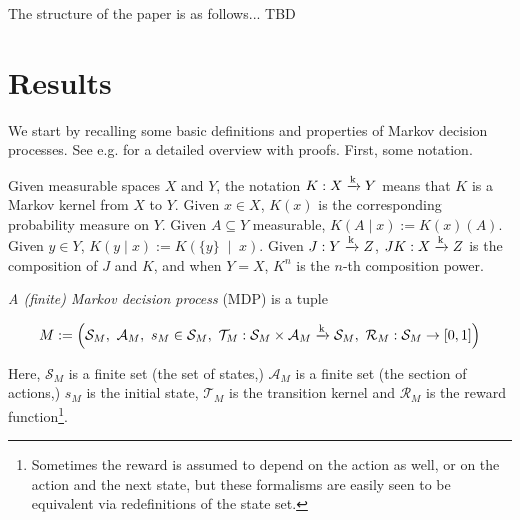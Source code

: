 \documentclass[anon,12pt]{colt2018} %
\newcommand{\Comment}[1]{}
\newcommand{\AP}[1]{\left(#1\right)}
\newcommand{\APM}[2]{\left(#1\;\middle\vert\;#2\right)}
\newcommand{\K}{\xrightarrow{\textnormal{k}}}
\newcommand{\A}{\mathcal{A}}
\newcommand{\St}{\mathcal{S}}
\newcommand{\T}{\mathcal{T}}
\newcommand{\R}{\mathcal{R}}
\begin{document}
\Comment{We also consider situations in which there are states of the environment (that we call \enquote{corrupted}) for which the reward signal and/or the advisor become unreliable (i.e. the observed reward in these states might be different from the \enquote{true} reward w.r.t. which regret is defined, and the advisor in these states might fail to satisfy the assumptions we otherwise require from it.) For example, we might imagine a robot that, through its own actions, damages its own input channels or even provides \enquote{deliberately} misleading information to the human operator. Indeed, it has been argued~\cite{TBD} that reinforcement learning agents are incentivized to sabotage themselves in this way (for example \enquote{wirehead} i.e. tamper with itself in order to artificially set the reward to maximum) and therefore sufficiently powerful algorithms (beyond the current state of the art) are almost guaranteed to do so. We show that, assuming corrupted states can be avoided without sacrificing utility, and that the advisor in uncorrupted states never acts so as to enter a corrupted state, DRL can be used to achieve essentially the same regret bound as before (and in particular learn to avoid corruption.) Thus DRL not only combats traps in the external environment but also perverse incentives inside the agent itself.}

The structure of the paper is as follows... TBD

\section{Results}

We start by recalling some basic definitions and properties of Markov decision processes. See e.g. \cite{Feinberg2002} for a detailed overview with proofs. First, some notation. 

Given measurable spaces $X$ and $Y$, the notation $K: X \K Y$ means that $K$ is a Markov kernel from $X$ to $Y$. Given $x \in X$, $K(x)$ is the corresponding probability measure on $Y$. Given $A \subseteq Y$ measurable, $K(A \mid x) := K(x)(A)$. Given $y \in Y$, $K(y \mid x):=K\APM{\{y\}}{x}$. Given $J: Y \K Z$, $JK: X \K Z$ is the composition of $J$ and $K$, and when $Y = X$, $K^n$ is the $n$-th composition power.

\begin{samepage}
\begin{definition}

\emph{A (finite) Markov decision process} (MDP) is a tuple

$$M:=\AP{\St_M,\ \A_M,\ s_M\in \St_M,\ \T_M: \St_M \times \A_M \K \St_M,\ \R_M: \St_M \rightarrow [0,1]}$$

Here, $\St_M$ is a finite set (the set of states,) $\A_M$ is a finite set (the section of actions,) $s_M$ is the initial state, $\T_M$ is the transition kernel and $\R_M$ is the reward function\footnote{Sometimes the reward is assumed to depend on the action as well, or on the action and the next state, but these formalisms are easily seen to be equivalent via redefinitions of the state set.}.

\end{definition}
\end{samepage}
\end{document}
